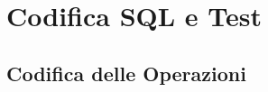 \documentclass[12pt]{article} %
\begin{document}
	\section{Codifica SQL e Test}


%
		\subsection{Codifica delle Operazioni}

		
%
%
\end{document}
